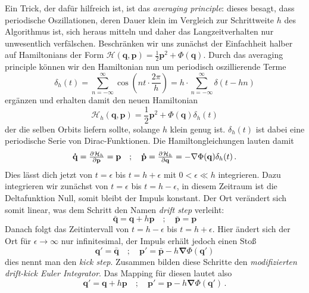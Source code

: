 \documentclass[12pt,a4paper,twoside]{article}
\renewcommand{\vec}{\mathbf}
\renewcommand{\H}{\mathcal H}
\begin{document}
Ein Trick, der dafür hilfreich ist, ist das \textit{averaging principle}: dieses besagt, dass periodische Oszillationen, deren Dauer klein im Vergleich zur Schrittweite $h$ des Algorithmus ist, sich heraus mitteln und daher das Langzeitverhalten nur unwesentlich verfälschen\cite{Wisdom1991}.
Beschränken wir uns zunächst der Einfachheit halber auf Hamiltonians der Form $\mathcal H(\vec q,\vec p)= \frac{1}{2}\vec p^2+\Phi(\vec q)$. %
Durch das averaging principle können wir den Hamiltonian nun um periodisch oszillierende Terme
\begin{equation}
\delta_h(t) = \sum\limits_{n=-\infty}^{\infty} \cos(nt\cdot \frac{2\pi}{h}) = h \cdot \sum\limits_{n=-\infty}^{\infty} \delta(t-h n)
\end{equation} %
ergänzen und erhalten damit den neuen Hamiltonian
\begin{equation}
\mathcal H_h(\vec q,\vec p)= \frac{1}{2}\vec p^2+\Phi(\vec q)\delta_h(t)
\end{equation}
der die selben Orbits liefern sollte, solange $h$ klein genug ist. $\delta_h(t)$ ist dabei eine periodische Serie von Dirac-Funktionen. Die Hamiltongleichungen lauten damit
\begin{equation}
\vec{\dot q} = \pd{\H_h}{\vec{p}} = \vec{p} \quad ; \quad 
\vec{\dot p} = \pd{\H_h}{\vec{q}} = - \vec{\nabla}\Phi(\vec q)\delta_h(t) \, .
\end{equation}
Dies lässt dich jetzt von $t=\epsilon$ bis $t=h+\epsilon$ mit $0 < \epsilon \ll h$ integrieren. Dazu integrieren wir zunächst von $t=\epsilon$ bis $t=h-\epsilon$, in diesem Zeitraum ist die Deltafunktion Null, somit bleibt der Impuls konstant. Der Ort verändert sich somit linear, was dem Schritt den Namen \textit{drift step} verleiht:
\begin{equation}
\bar{\vec{q}} = \vec{q}+h\vec{p} \quad ; \quad \bar{\vec{p}} = \vec{p}
\end{equation}
Danach folgt das Zeitintervall von $t=h-\epsilon$ bis $t=h+\epsilon$. Hier ändert sich der Ort für $\epsilon\to\infty$ nur infinitesimal, der Impuls erhält jedoch einen Stoß
\begin{equation}
\vec{q'}=\vec{\bar{q}} \quad ; \quad \vec{p'}=\vec{\bar{p}}-h\vec{\nabla}\Phi(\vec{q'})
\end{equation}
dies nennt man den \textit{kick step}. Zusammen bilden diese Schritte den \textit{modifizierten drift-kick Euler Integrator}\cite{Binney2008}.
Das Mapping für diesen lautet also
\begin{equation}
\vec{q'}=\vec{q}+h\vec{p} \quad ; \quad \vec{p'}=\vec{p}-h\vec{\nabla}\Phi(\vec{q'})\,.
\end{equation}
\end{document}
